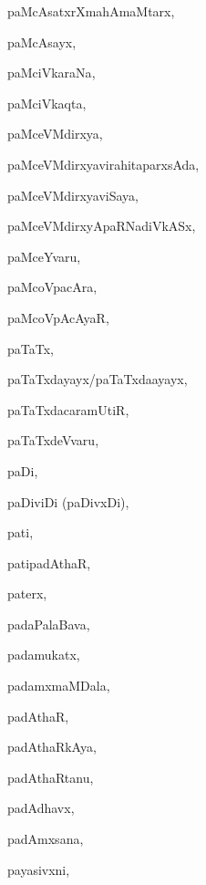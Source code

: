 \begin{multicols}{3}
{\noindent
{paMcAsatxrXmahAmaMtarx}, \pageref{paMcAsatxrXmahAmaMtarx}

\noindent
{paMcAsayx}, \pageref{paMcAsayx}

\noindent
{paMciVkaraNa}, \pageref{paMciVkaraNa}

\noindent
{paMciVkaqta}, \pageref{paMciVkaqta}

\noindent
{paMceVMdirxya}, \pageref{paMceVMdirxya}

\noindent
{paMceVMdirxyavirahitaparxsAda}, \pageref{paMceVMdirxyavirahitaparxsAda}

\noindent
{paMceVMdirxyaviSaya}, \pageref{paMceVMdirxyaviSaya}

\noindent
{paMceVMdirxyApaRNadiVkASx}, \pageref{paMceVMdirxyApaRNadiVkASx}

\noindent
{paMceYvaru}, \pageref{paMceYvaru}

\noindent
{paMcoVpacAra}, \pageref{paMcoVpacAra}

\noindent
{paMcoVpAcAyaR}, \pageref{paMcoVpAcAyaR}

\noindent
{paTaTx}, \pageref{paTaTx}

\noindent
{paTaTxdayayx/paTaTxda{a}yayx}, \pageref{paTaTxdayayxpaTaTxdaayayx}

\noindent
{paTaTxdacaramUtiR}, \pageref{paTaTxdacaramUtiR}

\noindent
{paTaTxdeVvaru}, \pageref{paTaTxdeVvaru}

\noindent
{paDi}, \pageref{paDi}

\noindent
{paDiviDi (paDivxDi)}, \pageref{paDiviDipaDivxDi}

\noindent
{pati}, \pageref{pati}

\noindent
{patipadAthaR}, \pageref{patipadAthaR}

\noindent
{paterx}, \pageref{paterx}

\noindent
{padaPalaBava}, \pageref{padaPalaBava}

\noindent
{padamukatx}, \pageref{padamukatx}

\noindent
{padamxmaMDala}, \pageref{padamxmaMDala}

\noindent
{padAthaR}, \pageref{padAthaR}

\noindent
{padAthaRkAya}, \pageref{padAthaRkAya}

\noindent
{padAthaRtanu}, \pageref{padAthaRtanu}

\noindent
{padAdhavx}, \pageref{padAdhavx}

\noindent
{padAmxsana}, \pageref{padAmxsana}

\noindent
{payasivxni}, \pageref{payasivxni}

}
\end{multicols}
